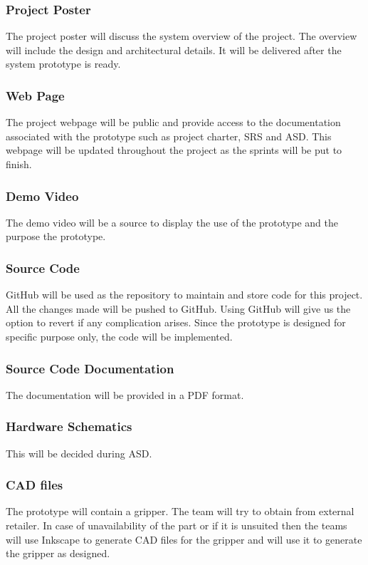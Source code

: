 \subsubsection{Project Poster}
The project poster will discuss the system overview of the project. The overview will include the design and architectural details. It will be delivered after the system prototype is ready. 

\subsubsection{Web Page}
The project webpage will be public and provide access to the documentation associated with the prototype such as project charter, SRS and ASD. This webpage will be updated throughout the project as the sprints will be put to finish. 

\subsubsection{Demo Video}
The demo video will be a source to display the use of the prototype and the purpose the prototype. 

\subsubsection{Source Code}
GitHub will be used as the repository to maintain and store code for this project. All the changes made will be pushed to GitHub. Using GitHub will give us the option to revert if any complication arises. Since the prototype is designed for specific purpose only, the code will be implemented. 

\subsubsection{Source Code Documentation}
The documentation will be provided in a PDF format. 

\subsubsection{Hardware Schematics}
This will be decided during ASD. 

\subsubsection{CAD files}
The prototype will contain a gripper. The team will try to obtain from external retailer. In case of unavailability of the part or if it is unsuited then the teams will use Inkscape to generate CAD files for the gripper and will use it to generate the gripper as designed. 


